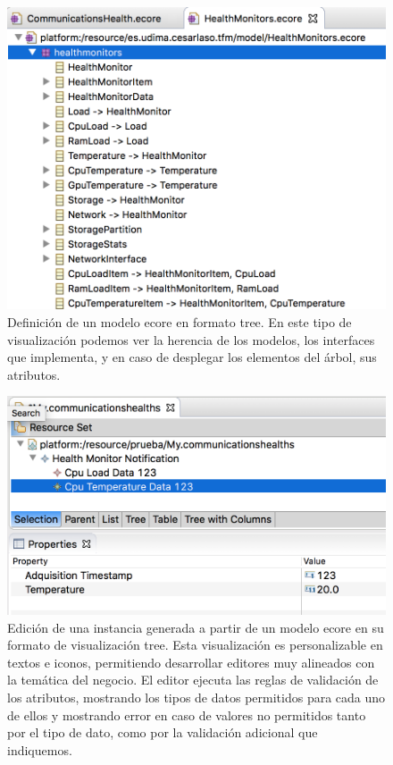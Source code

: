 \begin{figure}
	\centering
    \includegraphics[scale=0.4]{images/estado_cuestion/ecore_ejemplo1.png}
    \sourcepropia{}
    \caption[Definición de un modelo \gls{ecore} en formato tree]{Definición de un modelo \gls{ecore} en formato tree. En este tipo de visualización podemos ver la herencia de los modelos, los interfaces que implementa, y en caso de desplegar los elementos del árbol, sus atributos.}
    \label{fig:estado_ecore_ejemplo1}
\end{figure}

\begin{figure}
	\centering
    \includegraphics[scale=0.4]{images/estado_cuestion/ecore_ejemplo2.png}
    \sourcepropia{}
    \caption[Edición de una instancia generada a partir de un modelo \gls{ecore} en su formato de visualización tree]{Edición de una instancia generada a partir de un modelo \gls{ecore} en su formato de visualización tree. Esta visualización es personalizable en textos e iconos, permitiendo desarrollar editores muy alineados con la temática del negocio. El editor ejecuta las reglas de validación de los atributos, mostrando los tipos de datos permitidos para cada uno de ellos y mostrando error en caso de valores no permitidos tanto por el tipo de dato, como por la validación adicional que indiquemos.}
    \label{fig:estado_ecore_ejemplo2}
\end{figure}


